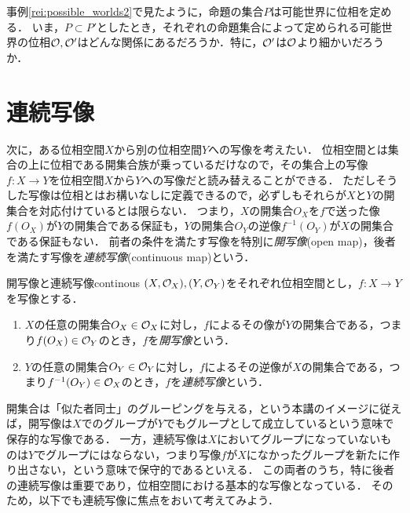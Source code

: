 \documentclass[11pt,a4paper, dvipdfmx]{jsarticle}
\begin{document}
\begin{hatten}{}{}
事例\ref{rei:possible_worlds2}で見たように，命題の集合$P$は可能世界に位相を定める．
いま，$P \subset P'$としたとき，それぞれの命題集合によって定められる可能世界の位相$\mathcal{O}, \mathcal{O}'$はどんな関係にあるだろうか．特に，$\mathcal{O}'$は$\mathcal{O}$より細かいだろうか．
\end{hatten}






\section{連続写像}
次に，ある位相空間$X$から別の位相空間$Y$への写像を考えたい．
位相空間とは集合の上に位相である開集合族が乗っているだけなので，その集合上の写像$f:X \to Y$を位相空間$X$から$Y$への写像だと読み替えることができる．
ただしそうした写像は位相とはお構いなしに定義できるので，必ずしもそれらが$X$と$Y$の開集合を対応付けているとは限らない．
つまり，$X$の開集合$O_X$を$f$で送った像$f(O_X)$が$Y$の開集合である保証も，$Y$の開集合$O_Y$の逆像$f^{-1}(O_Y)$が$X$の開集合である保証もない．
前者の条件を満たす写像を特別に\emph{開写像}(open map)，後者を満たす写像を\emph{連続写像}(continuous map)という．

\begin{dfn}{開写像と連続写像}{continous}
  $(X, \mathcal{O}_X), (Y, \mathcal{O}_Y)$をそれぞれ位相空間とし，$f:X \to Y$を写像とする．
  \begin{enumerate}
    \item $X$の任意の開集合$O_X \in \mathcal{O}_X$に対し，$f$によるその像が$Y$の開集合である，つまり$f(O_X) \in \mathcal{O}_Y$のとき，$f$を\emph{開写像}という．
    \item $Y$の任意の開集合$O_Y \in \mathcal{O}_Y$に対し，$f$によるその逆像が$X$の開集合である，つまり$f^{-1}(O_Y) \in \mathcal{O}_X$のとき，$f$を\emph{連続写像}という．
  \end{enumerate}  
\end{dfn}
  

開集合は「似た者同士」のグルーピングを与える，という本講のイメージに従えば，開写像は$X$でのグループが$Y$でもグループとして成立しているという意味で保存的な写像である．
一方，連続写像は$X$においてグループになっていないものは$Y$でグループにはならない，つまり写像$f$が$X$になかったグループを新たに作り出さない，という意味で保守的であるといえる．
この両者のうち，特に後者の連続写像は重要であり，位相空間における基本的な写像となっている．
そのため，以下でも連続写像に焦点をおいて考えてみよう．
\end{document}
